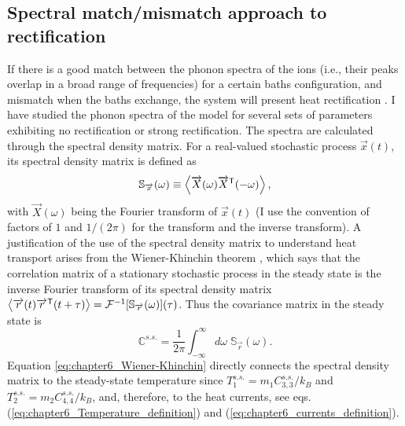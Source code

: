 \subsection{Spectral match/mismatch approach to rectification}



If there is a good match between the phonon spectra of the ions (i.e., their peaks overlap in a broad range of frequencies) for a certain baths configuration, and mismatch when the baths exchange, the system will present heat rectification \cite{Terraneo2002,Li2004}.
I have studied the phonon spectra of the model for several sets of parameters exhibiting no rectification or strong rectification. The spectra are calculated  through the spectral density matrix. For a real-valued stochastic process $\overrightarrow{x}(t)$, its spectral density matrix is defined as \cite{Sarkka2019}
%
\begin{equation}
  \mathbb{S}_{\overrightarrow{x}}(\omega) \equiv \expval{ \overrightarrow{X}(\omega) \overrightarrow{X}^\mathsf{T}(-\omega) },
  \label{eq:chapter6_SpectralDensityDefinition}
\end{equation}
%
with $\overrightarrow{X}(\omega)$ being the Fourier transform of $\overrightarrow{x}(t)$ (I use the convention of factors of $1$ and ${1}/{(2\pi)}$ for the transform and the inverse transform). A justification of the use of the spectral density matrix to understand heat transport arises from the Wiener-Khinchin theorem \cite{Sarkka2019}, which says that the correlation matrix of a stationary stochastic process in the steady state is the inverse Fourier transform of its spectral density matrix $\expval{\overrightarrow{r}(t)\overrightarrow{r}^\mathsf{T}(t+\tau)} = \mathcal{F}^{-1}[\mathbb{S}_{\overrightarrow{r}}(\omega)](\tau)$. Thus the covariance matrix in the steady state is
%
\begin{equation}
  \mathbb{C}^{s.s.} = \frac{1}{2\pi} \int_{-\infty}^{\infty}d\omega\;\mathbb{S}_{\overrightarrow{r}}(\omega).
  \label{eq:chapter6_Wiener-Khinchin}
\end{equation}
%
Equation \eqref{eq:chapter6_Wiener-Khinchin} directly connects the spectral density matrix to the steady-state temperature
since  $T_1^{s.s.} = {m_1 C_{3,3}^{s.s.}}/{k_B}$ and $T_2^{s.s.} = {m_2 C_{4,4}^{s.s.}}/{k_B}$, and, therefore, to the heat currents,
see  eqs.(\ref{eq:chapter6_Temperature_definition}) and (\ref{eq:chapter6_currents_definition}).


